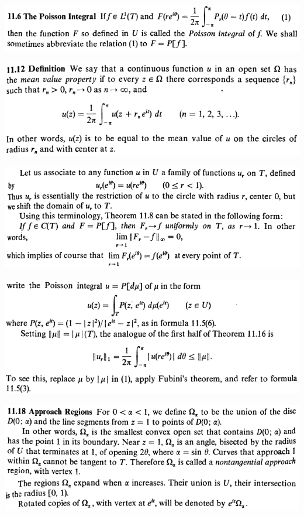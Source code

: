 \documentclass[12pt]{article}
\begin{document}
		\begin{center}
		\includegraphics[scale=0.9]{d11ponto6}
		\end{center}

		\begin{center}
		\includegraphics{d11ponto12}
		\end{center}

		\begin{center}
		\includegraphics[scale=0.9]{d11ponto15}
		\end{center}

		\begin{center}
		\includegraphics[scale=0.9]{d11ponto17}
		\end{center}

		\begin{center}
		\includegraphics[scale=0.9]{d11ponto18}
		\end{center}
\end{document}
